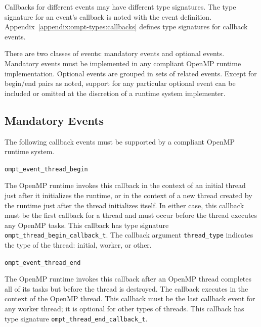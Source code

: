 \documentclass{article}
\newcommand{\descheader}[1]{{\needspace{3\baselineskip}\vspace{1em}\noindent \fbox{#1}}}
\begin{document}
Callbacks for different events may have different type signatures. 
The type signature for an event's callback is noted with the event definition.  Appendix~\ref{appendix:ompt-types:callbacks} defines type signatures for callback events.


There are two classes of events: mandatory events and optional events.
Mandatory events must be implemented in any compliant OpenMP runtime implementation. 
Optional events are grouped in sets of related events. Except for begin/end pairs as noted, support for any particular optional event can be included or omitted at the 
discretion of a runtime system implementer. 




\subsection{Mandatory Events}
\label{sec:mandatory-events}

 The following callback events must be supported by a compliant OpenMP 
 runtime system. 

\descheader{Threads}

\begin{description}

\item \verb|ompt_event_thread_begin|

The OpenMP runtime invokes this callback in the context of an initial thread just after it initializes the runtime, or in the context of a new thread created by the runtime just after the thread initializes itself. In either case, this callback must be the first callback for a thread
and must occur before the thread executes any OpenMP tasks. This callback has type signature \verb|ompt_thread_begin_callback_t|. 
The callback argument \verb|thread_type| indicates the type of the thread: initial, worker, or other.


\item \verb|ompt_event_thread_end|

The OpenMP runtime invokes this callback
after an OpenMP thread completes all of
its tasks but before the thread is destroyed. The callback
executes in the context of the OpenMP thread. This callback must be the last callback event for any worker thread; it is optional for other types of threads.
This callback has type signature \verb|ompt_thread_end_callback_t|. 

\end{description}

\descheader{Parallel Regions}
\end{document}

